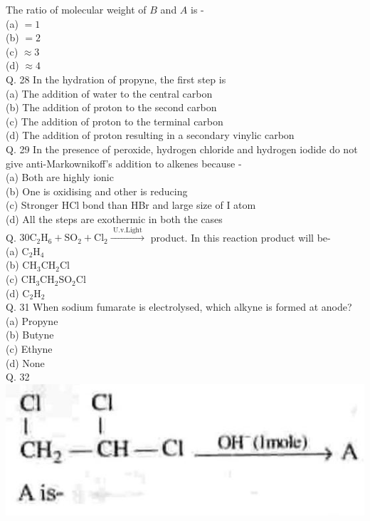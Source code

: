 \documentclass[10pt]{article}
\begin{document}
The ratio of molecular weight of $B$ and $A$ is -\\
(a) $=1$\\
(b) $=2$\\
(c) $\approx 3$\\
(d) $\approx 4$\\
Q. 28 In the hydration of propyne, the first step is\\
(a) The addition of water to the central carbon\\
(b) The addition of proton to the second carbon\\
(c) The addition of proton to the terminal carbon\\
(d) The addition of proton resulting in a secondary vinylic carbon\\
Q. 29 In the presence of peroxide, hydrogen chloride and hydrogen iodide do not give anti-Markownikoff's addition to alkenes because -\\
(a) Both are highly ionic\\
(b) One is oxidising and other is reducing\\
(c) Stronger HCl bond than HBr and large size of I atom\\
(d) All the steps are exothermic in both the cases\\
Q. $30 \mathrm{C}_{2} \mathrm{H}_{6}+\mathrm{SO}_{2}+\mathrm{Cl}_{2} \xrightarrow{\text { U.v.Light }}$ product. In this reaction product will be-\\
(a) $\mathrm{C}_{2} \mathrm{H}_{4}$\\
(b) $\mathrm{CH}_{3} \mathrm{CH}_{2} \mathrm{Cl}$\\
(c) $\mathrm{CH}_{3} \mathrm{CH}_{2} \mathrm{SO}_{2} \mathrm{Cl}$\\
(d) $\mathrm{C}_{2} \mathrm{H}_{2}$\\
Q. 31 When sodium fumarate is electrolysed, which alkyne is formed at anode?\\
(a) Propyne\\
(b) Butyne\\
(c) Ethyne\\
(d) None\\
Q. 32\\
\includegraphics[max width=\textwidth, center]{2025_01_28_8470952b98110cec3aabg-231(3)}\\
\end{document}
